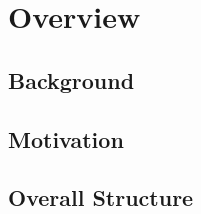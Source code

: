 \section{Overview}\label{sec:overview}

\subsection{Background}
\subsection{Motivation}
\subsection{Overall Structure}
